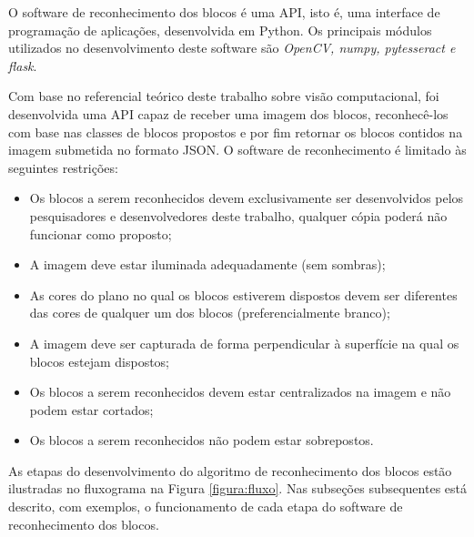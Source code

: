     O software de reconhecimento dos blocos é uma API, isto é, uma interface de programação de aplicações,  desenvolvida em Python. Os principais módulos utilizados no desenvolvimento deste software são \textit{OpenCV, numpy, pytesseract e flask}.

    Com base no referencial teórico deste trabalho sobre visão computacional, foi desenvolvida uma API capaz de receber uma imagem dos blocos, reconhecê-los com base nas classes de blocos propostos e por fim retornar os blocos contidos na imagem submetida no formato JSON. O software de reconhecimento é limitado às seguintes restrições:
    
        \begin{itemize}
        \item Os blocos a serem reconhecidos devem exclusivamente ser desenvolvidos pelos pesquisadores e desenvolvedores deste trabalho, qualquer cópia poderá não funcionar como proposto;
        \item A imagem deve estar iluminada adequadamente (sem sombras);
        \item As cores do plano no qual os blocos estiverem dispostos devem ser diferentes das cores de qualquer um dos blocos (preferencialmente branco);
        \item A imagem deve ser capturada de forma perpendicular à superfície na qual os blocos estejam dispostos;
       \item Os blocos a serem reconhecidos devem estar centralizados na imagem e não podem estar cortados;
      \item Os blocos a serem reconhecidos não podem estar sobrepostos.
    \end{itemize}

    As etapas do desenvolvimento do algoritmo de reconhecimento dos blocos estão ilustradas no fluxograma na Figura \ref{figura:fluxo}. 
    Nas subseções subsequentes está descrito, com exemplos, o funcionamento de cada etapa do software de reconhecimento dos blocos.
    

